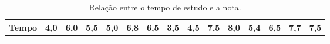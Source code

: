\documentclass[12pt,brazil,oneside]{book}
\begin{document}
\begin{longtable}[]{@{}lllllllllllllll@{}}
\caption{\label{tab:reg1}Relação entre o tempo de estudo e a
nota.}\tabularnewline
\toprule
\begin{minipage}[b]{0.10\columnwidth}\raggedright
\textbf{Tempo}\strut
\end{minipage} & \begin{minipage}[b]{0.04\columnwidth}\raggedright
4,0\strut
\end{minipage} & \begin{minipage}[b]{0.04\columnwidth}\raggedright
6,0\strut
\end{minipage} & \begin{minipage}[b]{0.04\columnwidth}\raggedright
5,5\strut
\end{minipage} & \begin{minipage}[b]{0.04\columnwidth}\raggedright
5,0\strut
\end{minipage} & \begin{minipage}[b]{0.04\columnwidth}\raggedright
6,8\strut
\end{minipage} & \begin{minipage}[b]{0.04\columnwidth}\raggedright
6,5\strut
\end{minipage} & \begin{minipage}[b]{0.04\columnwidth}\raggedright
3,5\strut
\end{minipage} & \begin{minipage}[b]{0.04\columnwidth}\raggedright
4,5\strut
\end{minipage} & \begin{minipage}[b]{0.04\columnwidth}\raggedright
7,5\strut
\end{minipage} & \begin{minipage}[b]{0.04\columnwidth}\raggedright
8,0\strut
\end{minipage} & \begin{minipage}[b]{0.04\columnwidth}\raggedright
5,4\strut
\end{minipage} & \begin{minipage}[b]{0.04\columnwidth}\raggedright
6,5\strut
\end{minipage} & \begin{minipage}[b]{0.04\columnwidth}\raggedright
7,7\strut
\end{minipage} & \begin{minipage}[b]{0.04\columnwidth}\raggedright
7,5\strut
\end{minipage}\tabularnewline
\midrule
\endfirsthead
\toprule
\begin{minipage}[b]{0.10\columnwidth}\raggedright

\end{minipage}
\end{longtable}
\end{document}

